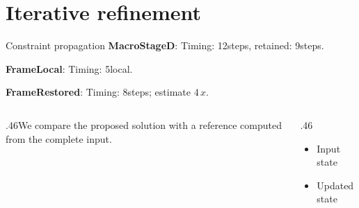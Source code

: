 \documentclass[12pt,aspectratio=43]{beamer}
\newcommand{\fuzzlayerA}[1]{\textbf{#1}}
\newcommand{\fuzzlayerB}[1]{\fuzzlayerA{#1}}
\newcommand{\fuzzlayerC}[1]{\fuzzlayerB{#1}}
\newcommand{\fuzzterm}[1]{\fuzzlayerC{#1}}
\newcommand{\fuzzpair}[2]{\fuzzterm{#1}: #2}
\newcommand{\fuzzunit}{steps}
\let\fuzzoriginalunit\fuzzunit
\newcommand{\fuzzcoefficient}{4}
\newcommand{\fuzzscale}[2][\fuzzcoefficient]{#1\,#2}
\begin{document}
\section{Iterative refinement}
\begin{frame}[t]{Constraint propagation}
\fuzzpair{MacroStageD}{Timing: 12\fuzzunit, retained: 9\fuzzoriginalunit.}\par
{\renewcommand{\fuzzunit}{local}\fuzzpair{FrameLocal}{Timing: 5\fuzzunit.}\par}
\fuzzpair{FrameRestored}{Timing: 8\fuzzunit; estimate $\fuzzscale{x}$.}\par
\begin{columns}[T]\begin{column}{.46\textwidth}We compare the proposed solution with a reference computed from the complete input.\end{column}\begin{column}{.46\textwidth}\begin{itemize}\item Input state\item Updated state\end{itemize}\end{column}\end{columns}
\end{frame}
\end{document}
